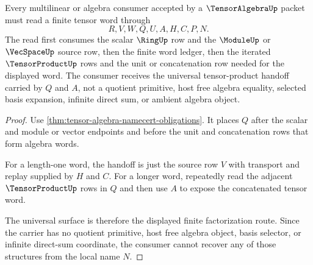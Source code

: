 \begin{theorem}
\label{thm:tensor-algebra-tensorproduct-universal-handoff}
Every multilinear or algebra consumer accepted by a $\TensorAlgebraUp$ packet must read a finite tensor word through
$$
R,V,W,Q,U,A,H,C,P,N.
$$
The read first consumes the scalar $\RingUp$ row and the $\ModuleUp$ or $\VecSpaceUp$ source row, then the finite word ledger, then the iterated $\TensorProductUp$ rows and the unit or concatenation row needed for the displayed word. The consumer receives the universal tensor-product handoff carried by $Q$ and $A$, not a quotient primitive, host free algebra equality, selected basis expansion, infinite direct sum, or ambient algebra object.
\end{theorem}
\begin{proof}
Use \autoref{thm:tensor-algebra-namecert-obligations}. It places $Q$ after the scalar and module or vector endpoints and before the unit and concatenation rows that form algebra words.

For a length-one word, the handoff is just the source row $V$ with transport and replay supplied by $H$ and $C$. For a longer word, repeatedly read the adjacent $\TensorProductUp$ rows in $Q$ and then use $A$ to expose the concatenated tensor word.

The universal surface is therefore the displayed finite factorization route. Since the carrier has no quotient primitive, host free algebra object, basis selector, or infinite direct-sum coordinate, the consumer cannot recover any of those structures from the local name $N$.
\end{proof}





